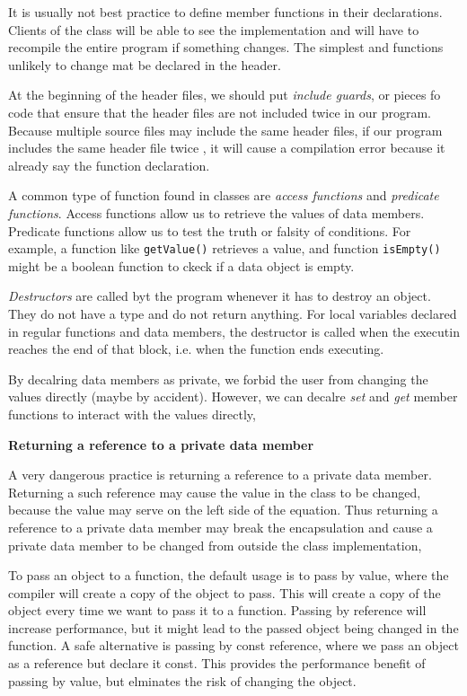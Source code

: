 \documentclass{article}
\begin{document}
It is usually not best practice to define member functions in their declarations.  Clients of the class
will be able to see the implementation and will have to recompile the entire program if something changes.
The simplest and functions unlikely to change mat be declared in the header. 

At the beginning of the header files, we should put \textit{include guards}, or pieces fo code that ensure that
the header files are not included twice in our program. Because multiple source files may include the same 
header files, if our program includes the same header file twice , it will cause a compilation error because
it already say the function declaration.

A common type of function found in classes are \textit{access functions} and \textit{predicate functions}. 
Access functions allow us to retrieve the values of data members. Predicate functions allow us to test the 
truth or falsity of conditions. For example, a function like \texttt{getValue()} retrieves a value, and function
\texttt{isEmpty()} might be a boolean function to ckeck if a data object is empty.

\textit{Destructors} are called byt the program whenever it has to destroy an object. They do not have a type 
and do not return anything. For local variables declared in regular functions and data members, the destructor
is called when the executin reaches the end of that block, i.e. when the function ends executing. 

By decalring data members as private, we forbid the user from changing the values directly (maybe by accident).
However, we can decalre \textit{set} and \textit{get} member functions to interact with the values 
directly, 

\hspace{10mm}\textbf{Returning a reference to a private data member}

A very dangerous practice is returning a reference to a private data member. Returning a such reference may cause
the value in the class to be changed, because the value may serve on the left side of the equation. Thus returning
a reference to a private data member  may break the encapsulation and cause a private data member to be changed
from outside the class implementation,

To pass an object to a function, the default usage is to pass by value, where the compiler will create a copy
of the object to pass. This will create a copy of the object every time we want to pass it to a function. Passing
by reference will increase performance, but it might lead to the passed object being changed in the function.
A safe alternative is passing by const reference, where we pass an object as a reference but declare it const. 
This provides the performance benefit of passing by value, but elminates the risk of changing the object.
\newpage
\end{document}
